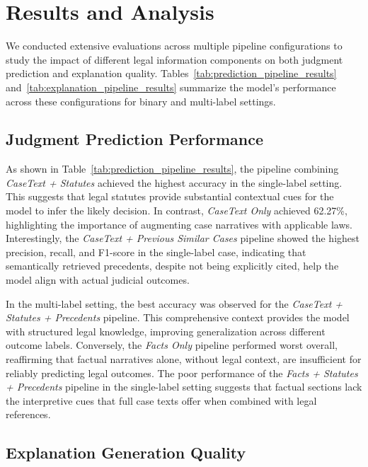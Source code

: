 \section{Results and Analysis}
\label{sec:results_analysis}

We conducted extensive evaluations across multiple pipeline configurations to study the impact of different legal information components on both judgment prediction and explanation quality. Tables~\ref{tab:prediction_pipeline_results} and~\ref{tab:explanation_pipeline_results} summarize the model's performance across these configurations for binary and multi-label settings.

\subsection{Judgment Prediction Performance}

As shown in Table~\ref{tab:prediction_pipeline_results}, the pipeline combining \textit{CaseText + Statutes} achieved the highest accuracy in the single-label setting. This suggests that legal statutes provide substantial contextual cues for the model to infer the likely decision. In contrast, \textit{CaseText Only} achieved 62.27\%, highlighting the importance of augmenting case narratives with applicable laws. Interestingly, the \textit{CaseText + Previous Similar Cases} pipeline showed the highest precision, recall, and F1-score in the single-label case, indicating that semantically retrieved precedents, despite not being explicitly cited, help the model align with actual judicial outcomes.

In the multi-label setting, the best accuracy was observed for the \textit{CaseText + Statutes + Precedents} pipeline. This comprehensive context provides the model with structured legal knowledge, improving generalization across different outcome labels. Conversely, the \textit{Facts Only} pipeline performed worst overall, reaffirming that factual narratives alone, without legal context, are insufficient for reliably predicting legal outcomes. The poor performance of the \textit{Facts + Statutes + Precedents} pipeline in the single-label setting suggests that factual sections lack the interpretive cues that full case texts offer when combined with legal references.

\subsection{Explanation Generation Quality}

